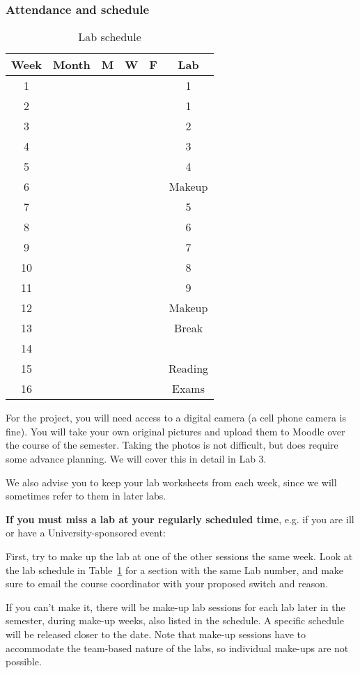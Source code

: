 \documentclass[main.tex]{subfiles}
\begin{document}
\subsubsection{Attendance and schedule}
\begin{table}[htb]
\caption{Lab schedule}
\begin{center}
\begin{tabular}{|c|c|c|c|c|c|}\hline
\textbf{Week} & \textbf{Month} & \textbf{M} & \textbf{W} & \textbf{F} & \textbf{Lab} \\\hline
1 &  &  &  &  & 1 \\\hline
2 &  &  &  &  & 1 \\\hline
3 &  &  &  &  & 2 \\\hline
4 &  &  &  &  & 3 \\\hline
5 &  &  &  &  & 4 \\\hline
6 &  &  &  &  & Makeup \\\hline
7 &  &  &  &  & 5 \\\hline
8 &  &  &  &  & 6 \\\hline
9 &  &  &  &  & 7 \\\hline
10 &  &  &  &  & 8 \\\hline
11 &  &  &  &  & 9 \\\hline
12 &  &  &  &  & Makeup \\\hline
13 &  &  &  &  & Break \\\hline
14 &  &  &  &  &  \\\hline
15 &  &  &  &  & Reading \\\hline
16 &  &  &  &  & Exams \\\hline
\end{tabular}
\end{center}
\label{tab:sched}
\end{table}%
\vspace{-20pt}

For the project, you will need access to a digital camera (a cell phone camera is fine). You will take your own original pictures and upload them to Moodle over the course of the semester. Taking the photos is not difficult, but does require some advance planning. We will cover this in detail in Lab 3.

We also advise you to keep your lab worksheets from each week, since we will sometimes refer to them in later labs.

\textbf{If you must miss a lab at your regularly scheduled time}, e.g. if you are ill or have a University-sponsored event:

First, try to make up the lab at one of the other sessions the same week. Look at the lab schedule in Table~\ref{tab:sched} for a section with the same Lab number, and make sure to email the course coordinator with your proposed switch and reason. 

If you can't make it, there will be make-up lab sessions for each lab later in the semester, during make-up weeks, also listed in the schedule. A specific schedule will be released closer to the date. Note that make-up sessions have to accommodate the team-based nature of the labs, so individual make-ups are not possible.
\end{document}
